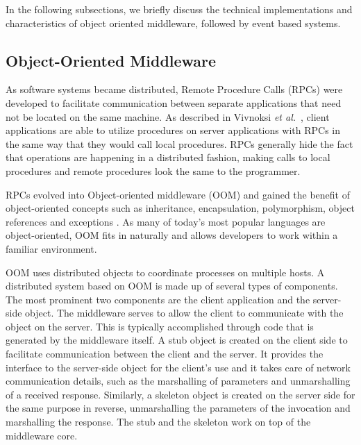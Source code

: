 \documentclass{acm_proc_article-sp}
\def\etal{{\it et al.\/}}
\begin{document}
In the following subsections, we briefly discuss the technical implementations and characteristics of  object oriented middleware, followed by event based systems. 





\subsection{Object-Oriented Middleware}
\label{sec:techobj}


As software systems became distributed, Remote Procedure Calls (RPCs) were developed to facilitate communication between separate applications that need not be located on the same machine.  As described in Vivnoksi \etal\ \cite{Vinoski:2004p8371}, client applications are able to utilize procedures on server applications with RPCs in the same way that they would call local procedures.  RPCs generally hide the fact that operations are happening in a distributed fashion, making calls to local procedures and remote procedures look the same to the programmer.

RPCs evolved into Object-oriented middleware (OOM) and gained the benefit of object-oriented concepts such as inheritance, encapsulation, polymorphism, object references and exceptions \cite{Pinus:2006p8367,Vinoski:2004p8371}.  As many of today's most popular languages are object-oriented, OOM fits in naturally and allows developers to work within a familiar environment.

OOM uses distributed objects to coordinate processes on multiple hosts.  A distributed system based on OOM is made up of several types of components.  The most prominent two components are the client application and the server-side object.  The middleware serves to allow the client to communicate with the object on the server.  This is typically accomplished through code that is generated by the middleware itself.  A stub object is created on the client side to facilitate communication between the client and the server.  It provides the interface to the server-side object for the client's use and it takes care of network communication details, such as the marshalling of parameters and unmarshalling of a received response.  Similarly, a skeleton object is created on the server side for the same purpose in reverse, unmarshalling the parameters of the invocation and marshalling the response.  The stub and the skeleton work on top of the middleware core.
\end{document}
